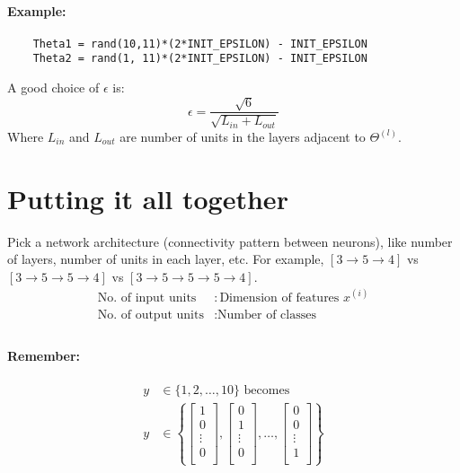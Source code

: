 \paragraph{Example:}
\begin{verbatim}
	Theta1 = rand(10,11)*(2*INIT_EPSILON) - INIT_EPSILON
	Theta2 = rand(1, 11)*(2*INIT_EPSILON) - INIT_EPSILON
\end{verbatim}

A good choice of $\epsilon$ is:
\begin{equation*}
	\epsilon = \frac{\sqrt{6}}{\sqrt{L_{in} + L_{out}}}
\end{equation*}
Where $L_{in}$ and $L_{out}$ are number of units in the layers
adjacent to $\Theta^{(l)}$.

\section{Putting it all together}
Pick a network architecture (connectivity pattern between neurons), like number of
layers, number of units in each layer, etc. For example, $[3 \rightarrow 5 \rightarrow 4]$
vs $[3 \rightarrow 5 \rightarrow 5 \rightarrow 4]$ vs $[3 \rightarrow 5 \rightarrow 5
			\rightarrow 5 \rightarrow 4]$.
\begin{align*}
	\text{No. of input units}  & : \text{Dimension of features } x^{(i)} \\
	\text{No. of output units} & : \text{Number of classes}              \\
\end{align*}
\paragraph{Remember:}
\begin{align*}
	y & \in \{1, 2, \dots, 10\}	\text{ becomes } \\
	y & \in \left\{
	\begin{bmatrix}
		1      \\
		0      \\
		\vdots \\
		0      \\
	\end{bmatrix},
	\begin{bmatrix}
		0      \\
		1      \\
		\vdots \\
		0      \\
	\end{bmatrix}, \dots,
	\begin{bmatrix}
		0      \\
		0      \\
		\vdots \\
		1      \\
	\end{bmatrix}
	\right\}
\end{align*}

